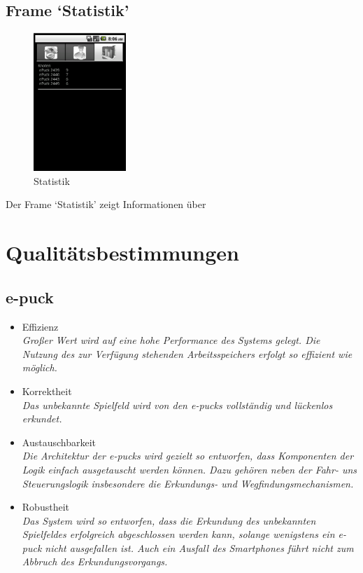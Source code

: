 \documentclass[10pt,a4paper]{article}
\let\oldsection\section
\renewcommand{\section}{\newpage \oldsection}
\begin{document}
			\subsection{Frame `Statistik'}
				\begin{figure}[h]
					  \centering
					\includegraphics[width=3.5cm]{screenshots/android3.png}
  					\caption{Statistik}
  				\end{figure}		
  				
  			Der Frame `Statistik' zeigt Informationen über 
			
	\section{Qualitätsbestimmungen}
		
		\subsection{e-puck}
			\begin{itemize}
				\item Effizienz
					\\ \textsl{Großer Wert wird auf eine hohe Performance des Systems gelegt. Die Nutzung des zur Verfügung stehenden
						Arbeitsspeichers erfolgt so effizient wie möglich.}
				\item Korrektheit
					\\ \textsl{Das unbekannte Spielfeld wird von den e-pucks vollständig und lückenlos erkundet.}
				\item Austauschbarkeit
					\\ \textsl{Die Architektur der e-pucks wird gezielt so entworfen, dass Komponenten der Logik einfach ausgetauscht
						werden können.
						Dazu gehören neben der Fahr- uns Steuerungslogik insbesondere die Erkundungs- und Wegfindungsmechanismen.}						
				\item Robustheit 
					\\ \textsl{Das System wird so entworfen, dass die Erkundung des unbekannten Spielfeldes erfolgreich abgeschlossen
						werden kann, solange wenigstens ein e-puck nicht ausgefallen ist.
						Auch ein Ausfall des Smartphones führt nicht zum Abbruch des Erkundungsvorgangs.
						}					
			\end{itemize}		
		
\end{document}
